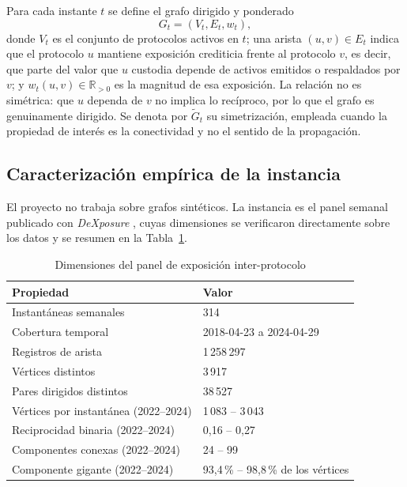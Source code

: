 \documentclass[journal]{IEEEtran}
\begin{document}
Para cada instante $t$ se define el grafo dirigido y ponderado
\begin{equation}
G_t = (V_t, E_t, w_t),
\label{eq:modelo}
\end{equation}
donde $V_t$ es el conjunto de protocolos activos en $t$; una arista
$(u,v) \in E_t$ indica que el protocolo $u$ mantiene exposición crediticia frente
al protocolo $v$, es decir, que parte del valor que $u$ custodia depende de
activos emitidos o respaldados por $v$; y $w_t(u,v) \in \mathbb{R}_{>0}$ es la
magnitud de esa exposición. La relación no es simétrica: que $u$ dependa de $v$ no
implica lo recíproco, por lo que el grafo es genuinamente dirigido. Se denota por
$\tilde{G}_t$ su simetrización, empleada cuando la propiedad de interés es la
conectividad y no el sentido de la propagación.

\subsection{Caracterización empírica de la instancia}

El proyecto no trabaja sobre grafos sintéticos. La instancia es el panel semanal
publicado con \emph{DeXposure} \cite{wu2025dexposure}, cuyas dimensiones se
verificaron directamente sobre los datos y se resumen en la Tabla~\ref{tab:datos}.

\begin{table}[!t]
\renewcommand{\arraystretch}{1.25}
\caption{Dimensiones del panel de exposición inter-protocolo}
\label{tab:datos}
\centering
\setlength{\tabcolsep}{5pt}
\begin{tabular}{ll}
\toprule
\textbf{Propiedad} & \textbf{Valor} \\
\midrule
Instantáneas semanales      & 314 \\
Cobertura temporal          & 2018-04-23 a 2024-04-29 \\
Registros de arista         & 1\,258\,297 \\
Vértices distintos          & 3\,917 \\
Pares dirigidos distintos   & 38\,527 \\
Vértices por instantánea (2022--2024) & 1\,083 -- 3\,043 \\
Reciprocidad binaria (2022--2024) & 0{,}16 -- 0{,}27 \\
Componentes conexas (2022--2024)  & 24 -- 99 \\
Componente gigante (2022--2024)   & 93{,}4\,\% -- 98{,}8\,\% de los vértices \\
\bottomrule
\end{tabular}
\end{table}
\end{document}
